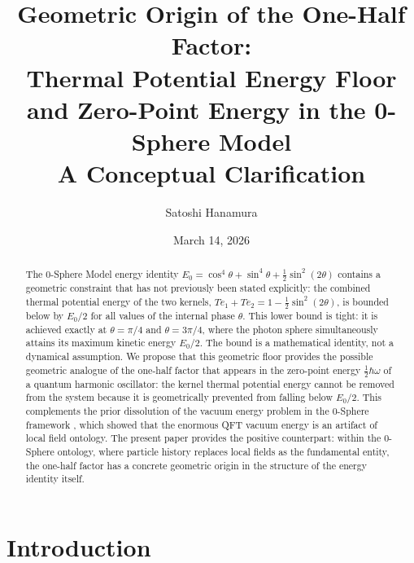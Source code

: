 \documentclass[%
 reprint, amsmath,amssymb, aps, prb, ]{revtex4-2}
\numberwithin{equation}{section}
\begin{document}
\title{Geometric Origin of the One-Half Factor:\\
Thermal Potential Energy Floor and Zero-Point Energy in the 0-Sphere Model\\[4pt]
{\normalsize A Conceptual Clarification}
}

\author{Satoshi Hanamura}
\date{March 14, 2026}

\begin{abstract}
The 0-Sphere Model energy identity $E_0 = \cos^4\theta + \sin^4\theta + \tfrac{1}{2}\sin^2(2\theta)$ contains a geometric constraint that has not previously been stated explicitly: the combined thermal potential energy of the two kernels, $Te_1 + Te_2 = 1 - \tfrac{1}{2}\sin^2(2\theta)$, is bounded below by $E_0/2$ for all values of the internal phase $\theta$.
This lower bound is tight: it is achieved exactly at $\theta = \pi/4$ and $\theta = 3\pi/4$, where the photon sphere simultaneously attains its maximum kinetic energy $E_0/2$.
The bound is a mathematical identity, not a dynamical assumption.
We propose that this geometric floor provides the possible geometric analogue of the one-half factor that appears in the zero-point energy $\tfrac{1}{2}\hbar\omega$ of a quantum harmonic oscillator: the kernel thermal potential energy cannot be removed from the system because it is geometrically prevented from falling below $E_0/2$.
This complements the prior dissolution of the vacuum energy problem in the 0-Sphere framework \cite{hanamura2026_32}, which showed that the enormous QFT vacuum energy is an artifact of local field ontology.
The present paper provides the positive counterpart: within the 0-Sphere ontology, where particle history replaces local fields as the fundamental entity, the one-half factor has a concrete geometric origin in the structure of the energy identity itself.
\end{abstract}

\maketitle

\section{Introduction}
\end{document}
